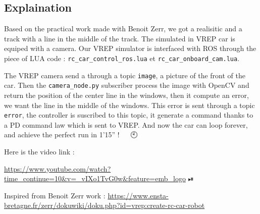 \subsection{Explaination}

Based on the practical work made with Benoit Zerr, we got a realisitic and a track with a line in the middle of the track.
The simulated in VREP car is equiped with a camera. Our VREP simulator is interfaced with ROS through the piece of LUA code :
\texttt{rc\_car\_control\_ros.lua} et \texttt{rc\_car\_onboard\_cam.lua}.

The VREP camera send a through a topic \texttt{image}, a picture of the front of the car. 
Then the \texttt{camera\_node.py} subscriber process the image with OpenCV and return the position
of the center line in the windows, then it compute an error, we want the line in the middle of the windows. 
This error is sent through a topic \texttt{error}, the controller is suscribed to this topic,
it generate a command thanks to a PD command law which is sent to VREP. And now the car can loop forever, and achieve 
the perfect run in 1'15'' ! 🚙 🏁 🕙


Here is the video link : 


\tiny{\url{https://www.youtube.com/watch?time_continue=10&v=_vIXo1TvG0w&feature=emb_logo}} ⏯

Inspired from Benoit Zerr work : \tiny{\url{https://www.ensta-bretagne.fr/zerr/dokuwiki/doku.php?id=vrep:create-rc-car-robot}}
